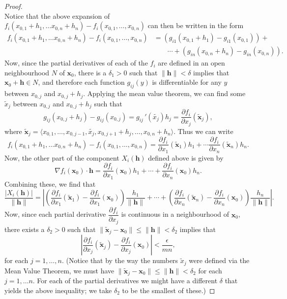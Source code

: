 \documentclass[12pt,letterpaper]{article}
\newcommand{\x}{\mathbf{x}}
\newcommand{\h}{\mathbf{h}}
\begin{document}
\begin{proof}
\[\]
Notice that the above expansion of $f_i(x_{0,1}+h_1,\ldots x_{0,n}+h_n)-f_i(x_{0,1},\ldots ,x_{0,n})$ can then be written in the form
\begin{align*}
f_i(x_{0,1}+h_1,\ldots x_{0,n}+h_n)-f_i(x_{0,1},\ldots ,x_{0,n}) &= \left(g_{i1}(x_{0,1}+h_1)-g_{i1}(x_{0,1})\right)+\\
& \quad\quad \cdots + \left(g_{in}(x_{0,n}+h_n)-g_{in}(x_{0,n})\right).
\end{align*}
Now, since the partial derivatives of each of the $f_i$ are defined in an open neighbourhood $N$ of $\x_0$, there is a $\delta_1>0$ such that $\lVert\h\rVert<\delta$ implies that $\x_0+\h\in N$, and therefore each function $g_{ij}(y)$ is differentiable for any $y$ between $x_{0,j}$ and $x_{0,j}+h_j$. Applying the mean value theorem, we can find some $\tilde{x}_j$ between $x_{0,j}$ and $x_{0,j}+h_j$ such that
\[
g_{ij}(x_{0,j}+h_j)-g_{ij}(x_{0,j}) = g_{ij}\,'(\tilde{x_j})h_j = \frac{\partial f_i}{\partial x_j}(\tilde{\x}_j),
\]
where $\tilde{\x}_j =\langle x_{0,1},\ldots, x_{0,j-1},\tilde{x_j},x_{0,j+1}+h_j,\ldots , x_{0,n}+h_n\rangle$. Thus we can write
\[
f_i(x_{0,1}+h_1,\ldots x_{0,n}+h_n)-f_i(x_{0,1},\ldots ,x_{0,n}) = \frac{\partial f_i}{\partial x_1}(\tilde{\x}_1)h_1+\cdots \frac{\partial f_i}{\partial x_n}(\tilde{\x}_n)h_n.
\]
Now, the other part of the component $X_i(\h)$ defined above is given by
\[
\nabla f_i(\x_0)\cdot \h = \frac{\partial f_i}{\partial x_1}(\x_0)h_1 +\cdots + \frac{\partial f_i}{\partial x_n}(\x_0)h_n.
\]
Combining these, we find that
\begin{equation}\label{eq1}
\frac{\lvert X_i(\h)\rvert}{\lVert \h\rVert} = \left| \left(\frac{\partial f_i}{\partial x_1}(\tilde{\x}_1)-\frac{\partial f_i}{\partial x_1}(\x_0)\right)\frac{h_1}{\lVert\h\rVert}+\cdots + \left(\frac{\partial f_i}{\partial x_n}(\tilde{\x}_n)-\frac{\partial f_i}{\partial x_n}(\x_0)\right)\frac{h_n}{\lVert\h\rVert}\right|.
\end{equation}
Now, since each partial derivative $\dfrac{\partial f_i}{\partial x_j}$ is continuous in a neighbourhood of $\x_0$, there exists a $\delta_2>0$ such that $\lVert \tilde{\x}_j-\x_0\rVert\leq \lVert\h\rVert<\delta_2$ implies that
\[
\left| \frac{\partial f_i}{\partial x_j}(\tilde{\x}_j)-\frac{\partial f_i}{\partial x_j}(\x_0)\right|<\frac{\epsilon}{mn},
\]
for each $j=1,\ldots ,n$. (Notice that by the way the numbers $\tilde{x}_j$ were defined via the Mean Value Theorem, we must have $\lVert \tilde{\x}_j-\x_0\rVert\leq \lVert\h\rVert<\delta_2$ for each $j=1,\ldots n$. For each of the partial derivatives we might have a different $\delta$ that yields the above inequality; we take $\delta_2$ to be the smallest of these.)


\end{proof}
\end{document}
